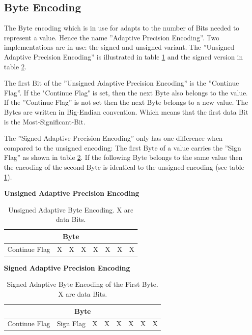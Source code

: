 \pagebreak
\subsection{Byte Encoding} \label{anhang:format:encodings}
The Byte encoding which is in use for adapts to the number of Bits needed to represent a value. Hence the name ''Adaptive Precision Encoding''. Two implementations are in use: the signed and unsigned variant. The ''Unsigned Adaptive Precision Encoding'' is illustrated in table \ref{anhang:format:encodings:adaptiveUnsigned} and the signed version in table \ref{anhang:format:encodings:adaptive}.

The first Bit of the ''Unsigned Adaptive Precision Encoding'' is the ''Continue Flag''. If the "Continue Flag" is set, then the next Byte also belongs to the value. If the ''Continue Flag'' is not set then the next Byte belongs to a new value. The Bytes are written in Big-Endian\cite{wiki:endianess} convention. Which means that the first data Bit is the Most-Significant-Bit.

The ''Signed Adaptive Precision Encoding'' only has one difference when compared to the unsigned encoding: The first Byte of a value carries the ''Sign Flag'' as shown in table \ref{anhang:format:encodings:adaptive}. If the following Byte belongs to the same value then the encoding of the second Byte is identical to the unsigned encoding (see table \ref{anhang:format:encodings:adaptiveUnsigned}).

\textbf{Unsigned Adaptive Precision Encoding}\\
\begin{table}[!htbp]
	\center
	\begin{tabular}{|c|c|c|c||c|c|c|c|}
	\hline
	\multicolumn{8}{|c|}{Byte}\\\hline
	Continue Flag & X & X & X & X & X & X & X \\\hline
	\end{tabular}
	\caption{Unsigned Adaptive Byte Encoding. X are data Bits.}
	\label{anhang:format:encodings:adaptiveUnsigned}
\end{table}

\textbf{Signed Adaptive Precision Encoding}\\
\begin{table}[!htbp]
	\center
	\begin{tabular}{|c|c|c|c||c|c|c|c|}
	\hline
	\multicolumn{8}{|c|}{Byte}\\\hline
	Continue Flag & Sign Flag & X & X & X & X & X & X \\\hline
	\end{tabular}
	\caption{Signed Adaptive Byte Encoding of the First Byte.  X are data Bits.}
	\label{anhang:format:encodings:adaptive}
\end{table}

